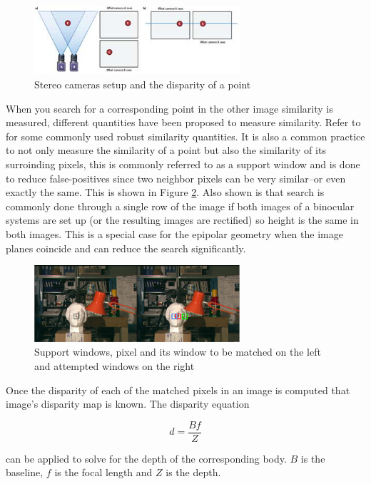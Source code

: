 \documentclass[conference]{IEEEtran}
\begin{document}
\begin{figure}[!t]
 \centering
 \includegraphics[width=3.0in]{stereo_setup}
 \caption{Stereo cameras setup and the disparity of a point}
 \label{fig:stereo_setup}
\end{figure}

When you search for a corresponding point in the other image similarity is measured, different quantities have been proposed to measure similarity. Refer to \cite{hong10} for some commonly used robust similarity quantities. It is also a common practice to not only measure the similarity of a point but also the similarity of its surroinding pixels, this is commonly referred to as a support window and is done to reduce false-positives since two neighbor pixels can be very similar--or even exactly the same. This is shown in Figure \ref{fig:support_windows}. Also shown is that search is commonly done through a single row of the image if both images of a binocular systems are set up (or the resulting images are rectified) so height is the same in both images. This is a special case for the epipolar geometry when the image planes coincide and can reduce the search significantly.

\begin{figure}[!t]
 \centering
 \includegraphics[width=3.0in]{support_windows}
 \caption{Support windows, pixel and its window to be matched on the left and attempted windows on the right}
 \label{fig:support_windows}
\end{figure}

Once the disparity of each of the matched pixels in an image is computed that image's disparity map is known. The disparity equation 

\begin{equation}
\label{eq:disparity}
d = \frac{Bf}{Z}
\end{equation}

can be applied to solve for the depth of the corresponding body. $B$ is the baseline, $f$ is the focal length and $Z$ is the depth.
\end{document}
